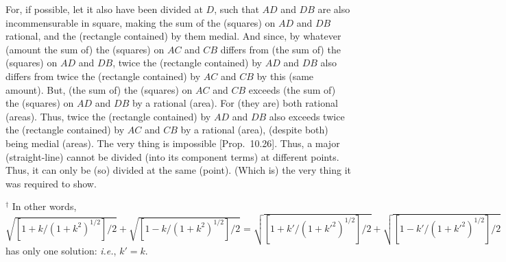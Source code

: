 \begin{Parallel}{}{}
{For, if possible, let it also have been divided at $D$, such that $AD$ and
$DB$ are also incommensurable in square, making the
sum of the (squares) on $AD$ and $DB$ rational, and the (rectangle contained) by them medial. And since, by whatever (amount the sum of)
the (squares) on $AC$ and $CB$ differs from (the sum of) the (squares)
on $AD$ and $DB$, 
twice the (rectangle contained) by $AD$ and $DB$ also differs from
twice the (rectangle contained) by $AC$ and $CB$ by this (same amount). But, (the sum of) the
(squares) on $AC$ and $CB$ exceeds (the sum of) the (squares) on
$AD$ and $DB$ by a rational (area). For (they are) both rational (areas). Thus, twice the
(rectangle contained) by $AD$ and $DB$ also exceeds twice the
(rectangle contained) by $AC$ and $CB$ by a rational (area), (despite both) being medial (areas).
The very thing is impossible [Prop.~10.26].
Thus, a major (straight-line) cannot be divided (into its component terms) at different points. Thus,
it can only be (so) divided at the same (point). (Which is) the very thing it was required to show.}
\end{Parallel}
{\footnotesize\noindent$^\dag$ In other words, $\sqrt{[1+k/(1+k^2)^{1/2}]/2} + \sqrt{[1-k/(1+k^2)^{1/2}]/2} =\sqrt{[1+k'/(1+k'^2)^{1/2}]/2} + \sqrt{[1-k'/(1+k'^2)^{1/2}]/2}$ has only one solution: {\em i.e.}, $k'=k$.}

